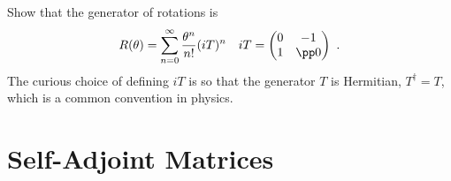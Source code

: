\begin{exercise}
Show that the generator of rotations is
\begin{align}
    R(\theta) &= \sum_{n=0}^\infty \frac{\theta^n}{n!} (iT)^n
    &
    iT=
    \begin{pmatrix}
        0 & -1\\
        1 & \pp 0
    \end{pmatrix} \ .
\end{align}
The curious choice of defining $iT$ is so that the generator $T$ is Hermitian, $T^\dag = T$, which is a common convention in physics.
\end{exercise}



\section{Self-Adjoint Matrices}

